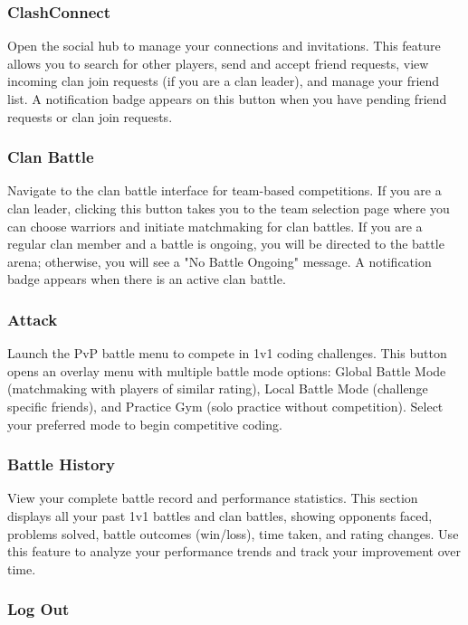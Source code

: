 \documentclass[12pt,a4paper]{article}
\begin{document}
\subsubsection{ClashConnect}

Open the social hub to manage your connections and invitations. This feature allows you to search for other players, send and accept friend requests, view incoming clan join requests (if you are a clan leader), and manage your friend list. A notification badge appears on this button when you have pending friend requests or clan join requests.

\subsubsection{Clan Battle}

Navigate to the clan battle interface for team-based competitions. If you are a clan leader, clicking this button takes you to the team selection page where you can choose warriors and initiate matchmaking for clan battles. If you are a regular clan member and a battle is ongoing, you will be directed to the battle arena; otherwise, you will see a "No Battle Ongoing" message. A notification badge appears when there is an active clan battle.

\subsubsection{Attack}

Launch the PvP battle menu to compete in 1v1 coding challenges. This button opens an overlay menu with multiple battle mode options: Global Battle Mode (matchmaking with players of similar rating), Local Battle Mode (challenge specific friends), and Practice Gym (solo practice without competition). Select your preferred mode to begin competitive coding.

\subsubsection{Battle History}

View your complete battle record and performance statistics. This section displays all your past 1v1 battles and clan battles, showing opponents faced, problems solved, battle outcomes (win/loss), time taken, and rating changes. Use this feature to analyze your performance trends and track your improvement over time.

\subsubsection{Log Out}
\end{document}
